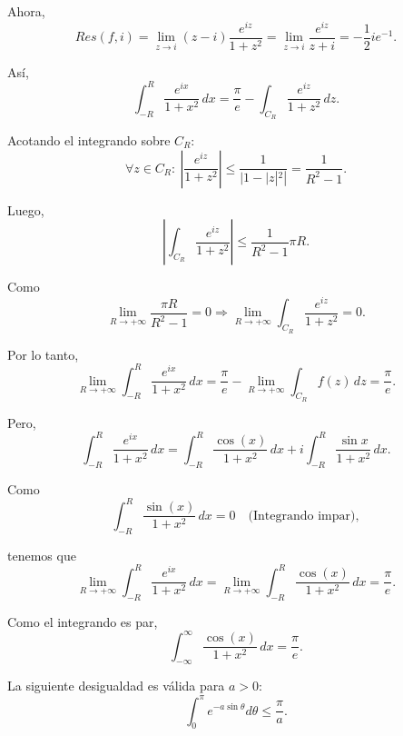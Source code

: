 \begin{ejemplo}
Ahora,
$$Res(f,i) = \lim_{z\to i} (z-i) \frac{e^{iz}}{1+z^2} = \lim_{z\to i} \frac{e^{iz}}{z+i} = - \frac{1}{2} i e^{-1}.$$

Así,
$$ \int_{-R}^R \frac{e^{ix}}{1+x^2} \,dx = \frac{\pi}{e} - \int_{C_R} \frac{e^{iz}}{1+z^2} \,dz.$$

Acotando el integrando sobre $C_R$:
$$\forall z \in C_R: ~ \left| \frac{e^{iz}}{1+z^2} \right| \leq \frac{1}{|1 - |z|^2|} = \frac{1}{R^2-1}.$$

Luego,
$$\left|\int_{C_R} \frac{e^{iz}}{1+z^2}\right| \leq \frac{1}{R^2-1} \pi R.$$

Como
$$\lim_{R\to + \infty} \frac{\pi R}{R^2-1} = 0 \Rightarrow \lim_{R\to + \infty} \int_{C_R} \frac{e^{iz}}{1+z^2} = 0.$$

Por lo tanto,
$$\lim_{R \to + \infty} \int_{-R}^R \frac{e^{ix}}{1+x^2} \,dx = \frac{\pi}{e} - \lim_{R\to + \infty} \int_{C_R} f(z) \,dz =  \frac{\pi}{e}.$$

Pero,
$$\int_{-R}^R \frac{e^{ix}}{1+x^2} \,dx = \int_{-R}^R \frac{\cos(x)}{1+x^2} \,dx + i \int_{-R}^R \frac{\sin x}{1+x^2} \,dx.$$

Como
$$\int_{-R}^R \frac{\sin(x)}{1+x^2} \,dx = 0 \quad  \mbox{(Integrando impar)},$$

tenemos que
$$\lim_{R \to + \infty} \int_{-R}^R \frac{e^{ix}}{1+x^2} \,dx = \lim_{R \to + \infty} \int_{-R}^R \frac{\cos(x)}{1+x^2} \,dx = \frac{\pi}{e}.$$

Como el integrando es par,
$$\int_{-\infty}^{\infty}\frac{\cos(x)}{1+x^2} \,dx = \frac{\pi}{e}. $$

\end{ejemplo}

\begin{lema}
La siguiente desigualdad es válida para $a > 0$:
$$\int_{0}^{\pi} e^{-a \sin \theta} d\theta \leq \frac{\pi}{a}.$$
\end{lema}

